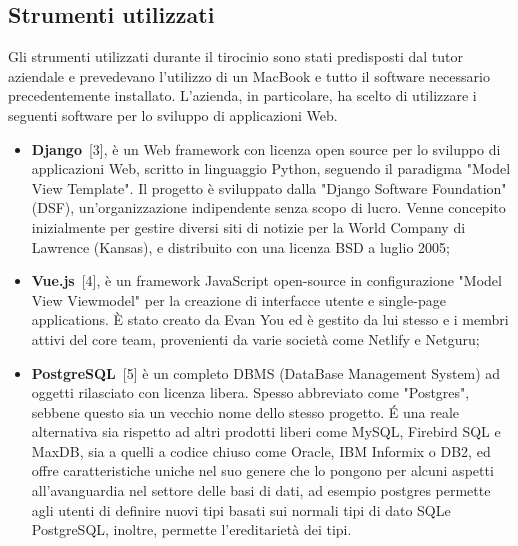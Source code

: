 \documentclass[12pt,a4paper]{article}
\begin{document}
\subsection{Strumenti utilizzati}
Gli strumenti utilizzati durante il tirocinio sono stati predisposti dal tutor aziendale e prevedevano l’utilizzo di un MacBook e tutto il software necessario precedentemente installato.
L'azienda, in particolare, ha scelto di utilizzare i seguenti software per lo sviluppo di applicazioni Web.

\begin{itemize}
    \item \textbf{Django}~[3], è un Web framework con licenza open source per lo sviluppo di applicazioni Web, scritto in linguaggio Python, seguendo il paradigma "Model View Template". Il progetto è sviluppato dalla "Django Software Foundation" (DSF), un'organizzazione indipendente senza scopo di lucro. Venne concepito inizialmente per gestire diversi siti di notizie per la World Company di Lawrence (Kansas), e distribuito con una licenza BSD a luglio 2005;

    \item \textbf{Vue.js}~[4], è un framework JavaScript open-source in configurazione "Model View Viewmodel" per la creazione di interfacce utente e single-page applications. È stato creato da Evan You ed è gestito da lui stesso e i membri attivi del core team, provenienti da varie società come Netlify e Netguru;

    \item\textbf{PostgreSQL}~[5] è un completo DBMS (DataBase Management System) ad oggetti rilasciato con licenza libera. Spesso abbreviato come "Postgres", sebbene questo sia un vecchio nome dello stesso progetto. É una reale alternativa sia rispetto ad altri prodotti liberi come MySQL, Firebird SQL e MaxDB, sia a quelli a codice chiuso come Oracle, IBM Informix o DB2, ed offre caratteristiche uniche nel suo genere che lo pongono per alcuni aspetti all'avanguardia nel settore delle basi di dati, ad esempio postgres permette agli utenti di definire nuovi tipi basati sui normali tipi di dato SQLe PostgreSQL, inoltre, permette l'ereditarietà dei tipi.
\end{itemize}
\end{document}
